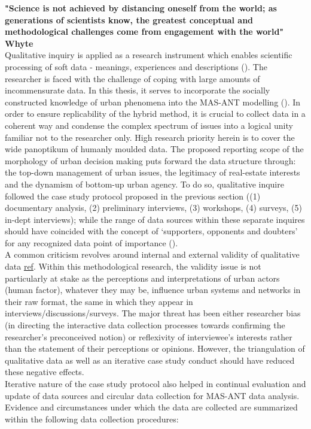 \documentclass[11pt]{report}
\begin{document}
\textbf{"Science is not achieved  by distancing oneself from  the world; as  generations of scientists  know,  the greatest conceptual and methodological challenges come from  engagement with the world" Whyte}
\\
Qualitative inquiry is applied as a research instrument which enables scientific processing of soft data - meanings, experiences and descriptions (\cite{(Yin, 1994)}). The researcher is faced with the challenge of coping with large amounts of incommensurate data. In this thesis, it serves to incorporate the socially constructed knowledge of urban phenomena into the MAS-ANT modelling (\cite{(Mertens 1998, Flick 2002, Grubovic)}).
In order to ensure replicability of the hybrid method, it is crucial to collect data in a coherent way and condense the complex spectrum of issues into a logical unity familiar not to the researcher only. High research priority herein is to cover the wide panoptikum of humanly moulded data. The proposed reporting scope of the morphology of urban decision making puts forward the data structure through: the top-down management of urban issues, the legitimacy of real-estate interests and the dynamism of bottom-up urban agency. To do so, qualitative inquire followed the case study protocol proposed in the previous section ((1) documentary analysis, (2) preliminary interviews, (3) workshops, (4) surveys, (5) in-dept interviews); while the range of data sources within these separate inquires should have coincided with the concept of ‘supporters, opponents and doubters’ for any recognized data point of importance (\cite{(Pettigrew XXXX, Harrison 2002)}). 
\\
A common criticism revolves around internal and external validity of qualitative data \href{ref}{ref}. Within this methodological research, the validity issue is not particularly at stake as the perceptions and interpretations of urban actors (human factor), whatever they may be, influence urban systems and networks in their raw format, the same in which they appear in interviews/discussions/surveys. The major threat has been either researcher bias (in directing the interactive data collection processes towards confirming the researcher's preconceived notion) or reflexivity of interviewee's interests rather than the statement of their perceptions or opinions. However, the triangulation of qualitative data as well as an iterative case study conduct should have reduced these negative effects.
\\
Iterative nature of the case study protocol also helped in continual evaluation and update of data sources and circular data collection for MAS-ANT data analysis. Evidence and circumstances under which the data are collected are summarized within the following data collection procedures: 
\end{document}
